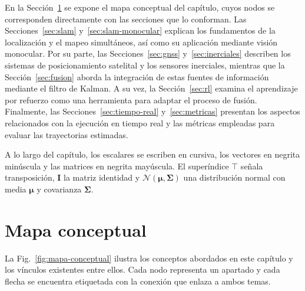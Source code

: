 En la Sección~\ref{sec:mapa} se expone el mapa conceptual del capítulo, cuyos nodos se corresponden directamente con las secciones que lo conforman.
Las Secciones~\ref{sec:slam} y~\ref{sec:slam-monocular} explican los fundamentos de la localización y el mapeo simultáneos, así como su aplicación mediante visión monocular.
Por su parte, las Secciones~\ref{sec:gnss} y~\ref{sec:inerciales} describen los sistemas de posicionamiento satelital y los sensores inerciales, mientras que la Sección~\ref{sec:fusion} aborda la integración de estas fuentes de información mediante el filtro de Kalman.
A su vez, la Sección~\ref{sec:rl} examina el aprendizaje por refuerzo como una herramienta para adaptar el proceso de fusión.
Finalmente, las Secciones~\ref{sec:tiempo-real} y~\ref{sec:metricas} presentan los aspectos relacionados con la ejecución en tiempo real y las métricas empleadas para evaluar las trayectorias estimadas.

A lo largo del capítulo, los escalares se escriben en cursiva, los vectores en negrita minúscula y las matrices en negrita mayúscula.
El superíndice $\top$ señala transposición, $\mathbf{I}$ la matriz identidad y $\mathcal{N}(\boldsymbol{\mu},\boldsymbol{\Sigma})$ una distribución normal con media $\boldsymbol{\mu}$ y covarianza $\boldsymbol{\Sigma}$.

\section{Mapa conceptual}
\label{sec:mapa}

La Fig.~\ref{fig:mapa-conceptual} ilustra los conceptos abordados en este capítulo y los vínculos existentes entre ellos.
Cada nodo representa un apartado y cada flecha se encuentra etiquetada con la conexión que enlaza a ambos temas.

